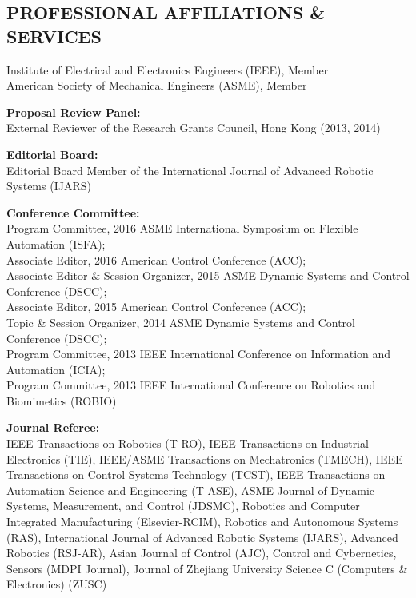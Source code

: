 \documentclass{res}
\begin{document}
\begin{resume}
\section{PROFESSIONAL AFFILIATIONS \& SERVICES}
\vspace{0.1in}
    Institute of Electrical and Electronics Engineers (IEEE), Member \\ %
    American Society of Mechanical Engineers (ASME), Member %

    \textbf{Proposal Review Panel:}\\ %
    External Reviewer of the Research Grants Council, Hong Kong (2013, 2014)

    \textbf{Editorial Board:}\\ %
    Editorial Board Member of the International Journal of Advanced Robotic Systems (IJARS)

    \textbf{Conference Committee:}\\ %
    Program Committee, 2016 ASME International Symposium on Flexible Automation (ISFA);\\
    Associate Editor, 2016 American Control Conference (ACC);\\
    Associate Editor \& Session Organizer, 2015 ASME Dynamic Systems and Control Conference (DSCC);\\
    Associate Editor, 2015 American Control Conference (ACC);\\
    Topic \& Session Organizer, 2014 ASME Dynamic Systems and Control Conference (DSCC);\\
    Program Committee, 2013 IEEE International Conference on Information and Automation (ICIA);\\
    Program Committee, 2013 IEEE International Conference on Robotics and Biomimetics (ROBIO)%

    \textbf{Journal Referee:}\\
    IEEE Transactions on Robotics (T-RO),
    IEEE Transactions on Industrial Electronics (TIE),
    IEEE/ASME Transactions on Mechatronics (TMECH),
    IEEE Transactions on Control Systems Technology (TCST),
    IEEE Transactions on Automation Science and Engineering (T-ASE),
    ASME Journal of Dynamic Systems, Measurement, and Control (JDSMC),
    Robotics and Computer Integrated Manufacturing (Elsevier-RCIM),
    Robotics and Autonomous Systems (RAS),
    International Journal of Advanced Robotic Systems (IJARS),
    Advanced Robotics (RSJ-AR),
    Asian Journal of Control (AJC),
    Control and Cybernetics,
    Sensors (MDPI Journal),
    Journal of Zhejiang University Science C (Computers \& Electronics) (ZUSC)


\end{resume}
\end{document}
